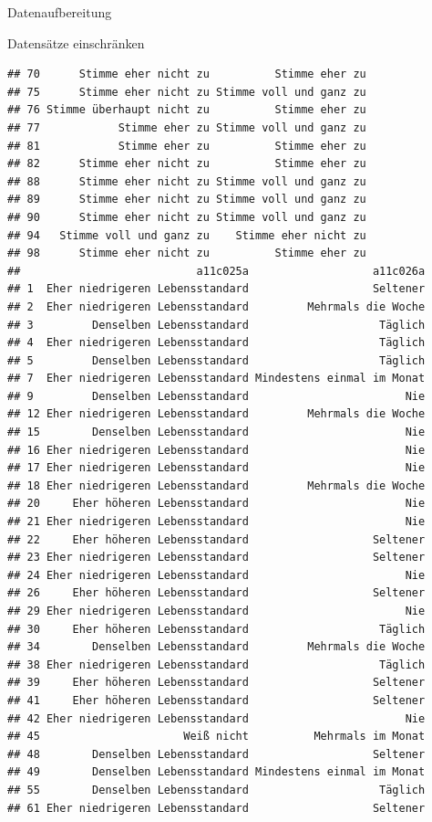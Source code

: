 \documentclass[ignorenonframetext,]{beamer}
\begin{document}
\begin{frame}[fragile]{Datenaufbereitung}
\begin{block}{Datensätze einschränken}
\begin{verbatim}
## 70      Stimme eher nicht zu          Stimme eher zu
## 75      Stimme eher nicht zu Stimme voll und ganz zu
## 76 Stimme überhaupt nicht zu          Stimme eher zu
## 77            Stimme eher zu Stimme voll und ganz zu
## 81            Stimme eher zu          Stimme eher zu
## 82      Stimme eher nicht zu          Stimme eher zu
## 88      Stimme eher nicht zu Stimme voll und ganz zu
## 89      Stimme eher nicht zu Stimme voll und ganz zu
## 90      Stimme eher nicht zu Stimme voll und ganz zu
## 94   Stimme voll und ganz zu    Stimme eher nicht zu
## 98      Stimme eher nicht zu          Stimme eher zu
##                           a11c025a                   a11c026a
## 1  Eher niedrigeren Lebensstandard                   Seltener
## 2  Eher niedrigeren Lebensstandard         Mehrmals die Woche
## 3         Denselben Lebensstandard                    Täglich
## 4  Eher niedrigeren Lebensstandard                    Täglich
## 5         Denselben Lebensstandard                    Täglich
## 7  Eher niedrigeren Lebensstandard Mindestens einmal im Monat
## 9         Denselben Lebensstandard                        Nie
## 12 Eher niedrigeren Lebensstandard         Mehrmals die Woche
## 15        Denselben Lebensstandard                        Nie
## 16 Eher niedrigeren Lebensstandard                        Nie
## 17 Eher niedrigeren Lebensstandard                        Nie
## 18 Eher niedrigeren Lebensstandard         Mehrmals die Woche
## 20     Eher höheren Lebensstandard                        Nie
## 21 Eher niedrigeren Lebensstandard                        Nie
## 22     Eher höheren Lebensstandard                   Seltener
## 23 Eher niedrigeren Lebensstandard                   Seltener
## 24 Eher niedrigeren Lebensstandard                        Nie
## 26     Eher höheren Lebensstandard                   Seltener
## 29 Eher niedrigeren Lebensstandard                        Nie
## 30     Eher höheren Lebensstandard                    Täglich
## 34        Denselben Lebensstandard         Mehrmals die Woche
## 38 Eher niedrigeren Lebensstandard                    Täglich
## 39     Eher höheren Lebensstandard                   Seltener
## 41     Eher höheren Lebensstandard                   Seltener
## 42 Eher niedrigeren Lebensstandard                        Nie
## 45                      Weiß nicht          Mehrmals im Monat
## 48        Denselben Lebensstandard                   Seltener
## 49        Denselben Lebensstandard Mindestens einmal im Monat
## 55        Denselben Lebensstandard                    Täglich
## 61 Eher niedrigeren Lebensstandard                   Seltener

\end{verbatim}
\end{block}
\end{frame}
\end{document}
